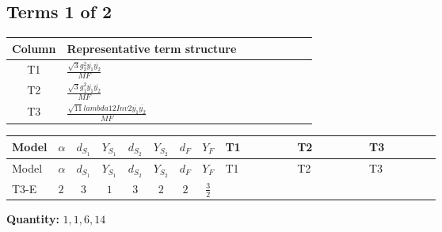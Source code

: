 \documentclass[8pt]{article}
\begin{document}
\begin{landscape}
\subsection*{Terms 1 of 2}
\begin{center}
\begin{tabular}{@{}c >{\raggedright\arraybackslash}p{0.82\linewidth}@{}}
\toprule
Column & Representative term structure \\
\midrule
T1 & \(\displaystyle \frac{\sqrt{3} g_{2}^{2} \overline{y_{1}} \overline{y_{2}}}{MF}\) \\
\midrule
T2 & \(\displaystyle \frac{\sqrt{3} g_{1}^{2} \overline{y_{1}} \overline{y_{2}}}{MF}\) \\
\midrule
T3 & \(\displaystyle \frac{\sqrt{11} lambda12Inv2 \overline{y_{1}} \overline{y_{2}}}{MF}\) \\
\midrule
\bottomrule
\end{tabular}
\end{center}
\smallskip
\tiny
\begin{longtable}{@{}llcccccc >{\raggedright\arraybackslash}p{0.21\linewidth} >{\raggedright\arraybackslash}p{0.21\linewidth} >{\raggedright\arraybackslash}p{0.21\linewidth}@{}}
\toprule
Model & $\alpha$ & $d_{S_1}$ & $Y_{S_1}$ & $d_{S_2}$ & $Y_{S_2}$ & $d_F$ & $Y_F$ & T1 & T2 & T3 \\
\midrule
\endfirsthead
\toprule
Model & $\alpha$ & $d_{S_1}$ & $Y_{S_1}$ & $d_{S_2}$ & $Y_{S_2}$ & $d_F$ & $Y_F$ & T1 & T2 & T3 \\
\midrule
\endhead
T3-E & $2$ & $3$ & $1$ & $3$ & $2$ & $2$ & $\frac{3}{2}$ & \scriptsize\adjustbox{max width=\linewidth}{$\begin{gathered} - \frac{11 \sqrt{3} g_{2}^{2} \overline{y_{1}} \overline{y_{2}}}{8 MF}\end{gathered}$} & \scriptsize\adjustbox{max width=\linewidth}{$\begin{gathered} - \frac{9 \sqrt{3} g_{1}^{2} \overline{y_{1}} \overline{y_{2}}}{8 MF}\end{gathered}$} & \scriptsize\adjustbox{max width=\linewidth}{$\begin{gathered} - \frac{3 \sqrt{11} lambda12Inv2 \overline{y_{1}} \overline{y_{2}}}{22 MF}\end{gathered}$} \\
\midrule
\bottomrule
\end{longtable}
\clearpage
\noindent\textbf{Quantity: }$\mathrm{1,1,6,14}$\par\smallskip

\end{landscape}
\end{document}
